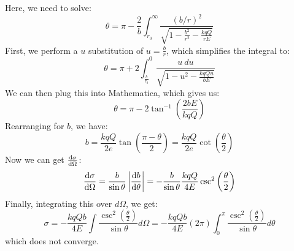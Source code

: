 \documentclass[10pt]{article}
\begin{document}
\begin{enumerate}[label=\alph*)]
			\begin{solution}
				Here, we need to solve:
				\[
					\theta = \pi - \frac{2}{b} \int_{r_0}^\infty \frac{(b/r)^2}{\sqrt{1 - \frac{b^2}{r^2} -
					\frac{kqQ}{rE}} }
				\] 
				First, we perform a $u$ substitution of $u = \frac{b}{r}$, which simplifies the integral to:
				\[
					\theta = \pi + 2 \int_{\frac{b}{r_0}}^{0} \frac{u \ du}{\sqrt{ 1 - u^2 - \frac{kqQu}{bE}} }
				\] 
				We can then plug this into Mathematica, which gives us: 
				\[
					\theta = \pi - 2\tan^{-1}\left( \frac{2bE}{kqQ} \right) 
				\] 
				Rearranging for $b$, we have: 
				\[
					b = \frac{kqQ}{2e} \tan\left( \frac{\pi - \theta}{2} \right)  =
					\frac{kqQ}{2e}\cot\left( \frac{\theta}{2} \right) 
				\] 
				Now we can get $\dv{\sigma}{\Omega}$:
				\[
					\dv{\sigma}{\Omega} = \frac{b}{\sin \theta} \left| \dv{b}{\theta}\right| = -\frac{b}{\sin \theta}\frac{kqQ}{4E}\csc^2\left( \frac{\theta}{2} \right) 
				\] 
				Finally, integrating this over $d\Omega$, we get:
				\[
					\sigma = -\frac{kqQb}{4E}\int \frac{\csc^2\left( \frac{\theta}{2} \right)}{\sin \theta} 
					d\Omega = -\frac{kqQb}{4E}(2\pi) \int_0^\pi \frac{\csc^2\left( \frac{\theta}{2} \right) }
					{\sin \theta} d\theta
				\] 
				which does not converge. 
			\end{solution}
	\end{enumerate}
\end{document}
